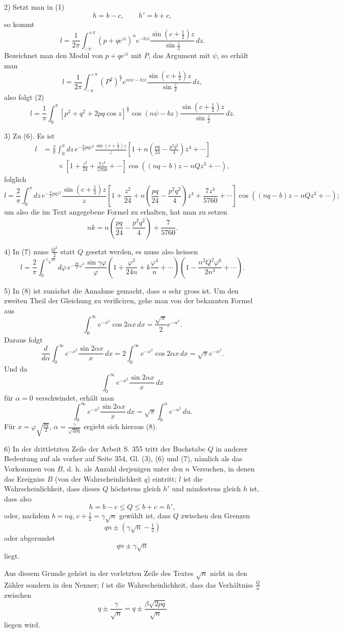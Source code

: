 \documentclass[11pt]{article}
\begin{document}
2) Setzt man in (1)
\[
 h=b-c,
 \qquad h'=b+c,
\]
so kommt
\[
 l=\frac{1}{2\pi}\int_{-\pi}^{+\pi}(p+qe^{zi})^n e^{-bzi}\frac{\sin(c+\frac12)z}{\sin\frac z2}\,dz.
\]
Bezeichnet man den Modul von $p+qe^{zi}$ mit $P$, das Argument mit $\psi$, so erhält man
\[
 l=\frac{1}{2\pi}\int_{-\pi}^{+\pi}(P^2)^{\frac n2}e^{ni\psi-bzi}\frac{\sin(c+\frac12)z}{\sin\frac z2}\,dz,
\]
also folgt (2)
\[
 l=\frac1\pi\int_0^\pi [p^2+q^2+2pq\cos z]^{\frac n2}\cos(n\psi-bz)\frac{\sin(c+\frac12)z}{\sin\frac z2}\,dz.
\]

3) Zu (6). Es ist
\[
\begin{aligned}
 l&=\frac2\pi\int_0^\pi dz\,e^{-\frac n2pqz^2}\frac{\sin(c+\frac12)z}{z}
 \left[1+n\left(\frac{pq}{24}-\frac{p^2q^2}{4}\right)z^4+\cdots\right]\\
&\qquad\times\left[1+\frac{z^2}{24}+\frac{7z^4}{5760}+\cdots\right]
 \cos((nq-b)z-nQz^3+\cdots),
\end{aligned}
\]
folglich
\[
 l=\frac2\pi\int_0^\pi dz\,e^{-\frac n2pqz^2}\frac{\sin(c+\frac12)z}{z}\left[1+\frac{z^2}{24}+n\left(\frac{pq}{24}-\frac{p^2q^2}{4}\right)z^4+\frac{7z^4}{5760}+\cdots\right]
 \cos((nq-b)z-nQz^3+\cdots);
\]
um also die im Text angegebene Formel zu erhalten, hat man zu setzen
\[
 nk=n\left(\frac{pq}{24}-\frac{p^2q^2}{4}\right)+\frac7{5760}.
\]

4) In (7) muss $\frac{Q^2}{2}$ statt $Q$ gesetzt werden, es muss also heissen
\[
 l=\frac2\pi\int_0^{\gamma\sqrt n}d\varphi\,e^{-\frac{pq}{2}\varphi^2}\frac{\sin\gamma\varphi}{\varphi}
 \left(1+\frac{\varphi^2}{24n}+k\frac{\varphi^4}{n}+\cdots\right)
 \left(1-\frac{n^2Q^2\varphi^6}{2n^3}+\cdots\right).
\]

5) In (8) ist zunächst die Annahme gemacht, dass $n$ sehr gross ist. Um den zweiten Theil der Gleichung zu verificiren, gehe man von der bekannten Formel aus
\[
 \int_0^\infty e^{-x^2}\cos 2\alpha x\,dx=\frac{\sqrt\pi}{2}e^{-\alpha^2}.
\]
Daraus folgt
\[
 \frac d{d\alpha}\int_0^\infty e^{-x^2}\frac{\sin 2\alpha x}{x}\,dx=2\int_0^\infty e^{-x^2}\cos2\alpha x\,dx=\sqrt\pi e^{-\alpha^2}.
\]
Und da
\[
 \int_0^\infty e^{-x^2}\frac{\sin2\alpha x}{x}\,dx
\]
für $\alpha=0$ verschwindet, erhält man
\[
 \int_0^\infty e^{-x^2}\frac{\sin2\alpha x}{x}\,dx=\sqrt\pi\int_0^\alpha e^{-u^2}\,du.
\]
Für $x=\varphi\sqrt{\frac{pq}{2}}$, $\alpha=\frac{\gamma}{\sqrt{2pq}}$ ergiebt sich hieraus (8).

6) In der drittletzten Zeile der Arbeit S. 355 tritt der Buchstabe $Q$ in anderer Bedeutung auf als vorher auf Seite 354, Gl. (3), (6) und (7), nämlich als das Vorkommen von $B$, d. h. als Anzahl derjenigen unter den $n$ Versuchen, in denen das Ereigniss $B$ (von der Wahrscheinlichkeit $q$) eintritt; $l$ ist die Wahrscheinlichkeit, dass dieses $Q$ höchstens gleich $h'$ und mindestens gleich $h$ ist, dass also
\[
 h=b-c\le Q\le b+c=h',
\]
oder, nachdem $b=nq$, $c+\frac12=\gamma\sqrt n$ gewählt ist, dass $Q$ zwischen den Grenzen
\[
 qn\pm(\gamma\sqrt n-\tfrac12)
\]
oder abgerundet
\[
 qn\pm\gamma\sqrt n
\]
liegt.

Aus diesem Grunde gehört in der vorletzten Zeile des Textes $\sqrt n$ nicht in den Zähler sondern in den Nenner; $l$ ist die Wahrscheinlichkeit, dass das Verhältniss $\frac Qn$ zwischen
\[
 q\pm\frac{\gamma}{\sqrt n}=q\pm\frac{\beta\sqrt{2pq}}{\sqrt n}
\]
liegen wird.
\end{document}
